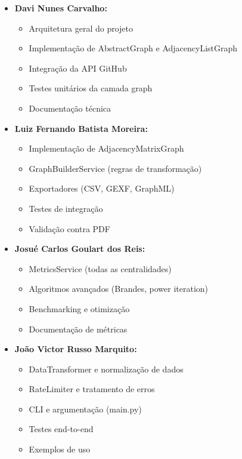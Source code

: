 \documentclass[12pt,a4paper]{article}
\begin{document}
\begin{itemize}
  \item \textbf{Davi Nunes Carvalho:}
    \begin{itemize}
      \item Arquitetura geral do projeto
      \item Implementação de AbstractGraph e AdjacencyListGraph
      \item Integração da API GitHub
      \item Testes unitários da camada graph
      \item Documentação técnica
    \end{itemize}

  \item \textbf{Luiz Fernando Batista Moreira:}
    \begin{itemize}
      \item Implementação de AdjacencyMatrixGraph
      \item GraphBuilderService (regras de transformação)
      \item Exportadores (CSV, GEXF, GraphML)
      \item Testes de integração
      \item Validação contra PDF
    \end{itemize}

  \item \textbf{Josué Carlos Goulart dos Reis:}
    \begin{itemize}
      \item MetricsService (todas as centralidades)
      \item Algoritmos avançados (Brandes, power iteration)
      \item Benchmarking e otimização
      \item Documentação de métricas
    \end{itemize}

  \item \textbf{João Victor Russo Marquito:}
    \begin{itemize}
      \item DataTransformer e normalização de dados
      \item RateLimiter e tratamento de erros
      \item CLI e argumentação (main.py)
      \item Testes end-to-end
      \item Exemplos de uso
    \end{itemize}
\end{itemize}
\end{document}
